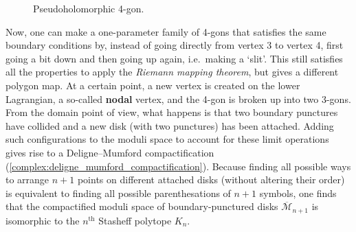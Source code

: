 \begin{property}
        \begin{figure}[ht!]
            \centering
            \caption{Pseudoholomorphic 4-gon.}
            \label{fig:floer_breaking}
        \end{figure}
        Now, one can make a one-parameter family of 4-gons that satisfies the same boundary conditions by, instead of going directly from vertex 3 to vertex 4, first going a bit down and then going up again, i.e.~making a `slit'. This still satisfies all the properties to apply the \textit{Riemann mapping theorem}, but gives a different polygon map. At a certain point, a new vertex is created on the lower Lagrangian, a so-called \textbf{nodal} vertex, and the 4-gon is broken up into two 3-gons. From the domain point of view, what happens is that two boundary punctures have collided and a new disk (with two punctures) has been attached. Adding such configurations to the moduli space to account for these limit operations gives rise to a Deligne--Mumford compactification (\cref{complex:deligne_mumford_compactification}). Because finding all possible ways to arrange $n+1$ points on different attached disks (without altering their order) is equivalent to finding all possible parenthesations of $n+1$ symbols, one finds that the compactified moduli space of boundary-punctured disks $\overline{\mathcal{M}}_{n+1}$ is isomorphic to the $n^{\text{th}}$ Stasheff polytope $K_n$.


\end{property}
